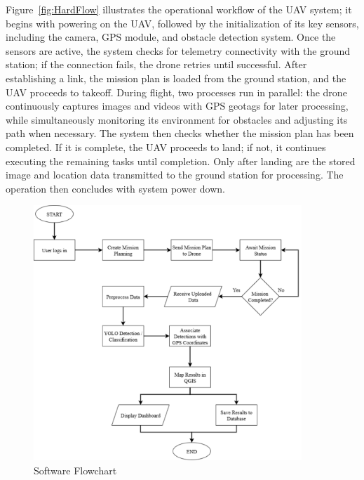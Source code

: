 Figure~\ref{fig:HardFlow} illustrates the operational workflow of the UAV system; it begins with powering on the UAV, followed by the initialization of its key sensors, including the camera, GPS module, and obstacle detection system. Once the sensors are active, the system checks for telemetry connectivity with the ground station; if the connection fails, the drone retries until successful. After establishing a link, the mission plan is loaded from the ground station, and the UAV proceeds to takeoff. During flight, two processes run in parallel: the drone continuously captures images and videos with GPS geotags for later processing, while simultaneously monitoring its environment for obstacles and adjusting its path when necessary. The system then checks whether the mission plan has been completed. If it is complete, the UAV proceeds to land; if not, it continues executing the remaining tasks until completion. Only after landing are the stored image and location data transmitted to the ground station for processing. The operation then concludes with system power down.

\begin{figure}[H]
	\centering
	\caption{Software Flowchart}
	\label{fig:SoftFlow}
	\includegraphics[width=0.9\textwidth]{figures/Soft_Flow.pdf}
\end{figure}

